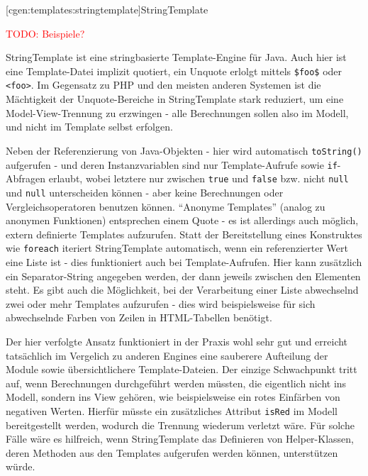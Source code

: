 \documentclass[a4paper, bibgerm]{book}
\newcommand\icode[1]{\lstinline?#1?}
\newcommand{\todo}[1]{
  \textcolor{red}{TODO: #1}
}
\newcommand\lsubsection{}
\begin{document}
\lsubsection[cgen:templates:stringtemplate]{StringTemplate}

\todo{Beispiele?}

StringTemplate\cite{StringTemplate} ist eine stringbasierte
Template-Engine für Java. Auch hier ist eine Template-Datei implizit
quotiert, ein Unquote erlolgt mittels \icode{$foo$} oder
\icode{<foo>}. Im Gegensatz zu PHP und den meisten anderen Systemen ist
die Mächtigkeit der Unquote-Bereiche in StringTemplate stark reduziert,
um eine Model-View-Trennung zu erzwingen - alle Berechnungen sollen also
im Modell, und nicht im Template selbst erfolgen.

Neben der Referenzierung von Java-Objekten - hier wird automatisch
\icode{toString()} aufgerufen - und deren Instanzvariablen sind nur
Template-Aufrufe sowie \icode{if}-Abfragen erlaubt, wobei letztere nur
zwischen \icode{true} und \icode{false} bzw. nicht \icode{null} und
\icode{null} unterscheiden können - aber keine Berechnungen oder
Vergleichsoperatoren benutzen können. "`Anonyme Templates"' (analog zu
anonymen Funktionen) entsprechen einem Quote - es ist allerdings auch
möglich, extern definierte Templates aufzurufen. Statt der Bereitstellung
eines Konstruktes wie \icode{foreach} iteriert StringTemplate
automatisch, wenn ein referenzierter Wert eine Liste ist - dies
funktioniert auch bei Template-Aufrufen. Hier kann zusätzlich ein
Separator-String angegeben werden, der dann jeweils zwischen den
Elementen steht. Es gibt auch die Möglichkeit, bei der Verarbeitung
einer Liste abwechselnd zwei oder mehr Templates aufzurufen - dies wird
beispielsweise für sich abwechselnde Farben von Zeilen in HTML-Tabellen
benötigt.

Der hier verfolgte Ansatz funktioniert in der Praxis wohl sehr gut und
erreicht tatsächlich im Vergelich zu anderen Engines eine sauberere
Aufteilung der Module sowie übersichtlichere Template-Dateien. Der
einzige Schwachpunkt tritt auf, wenn Berechnungen durchgeführt werden
müssten, die eigentlich nicht ins Modell, sondern ins View gehören, wie
beispielsweise ein rotes Einfärben von negativen Werten. Hierfür müsste
ein zusätzliches Attribut \icode{isRed} im Modell bereitgestellt werden,
wodurch die Trennung wiederum verletzt wäre. Für solche Fälle wäre es
hilfreich, wenn StringTemplate das Definieren von Helper-Klassen, deren
Methoden aus den Templates aufgerufen werden können, unterstützen würde.
\end{document}
